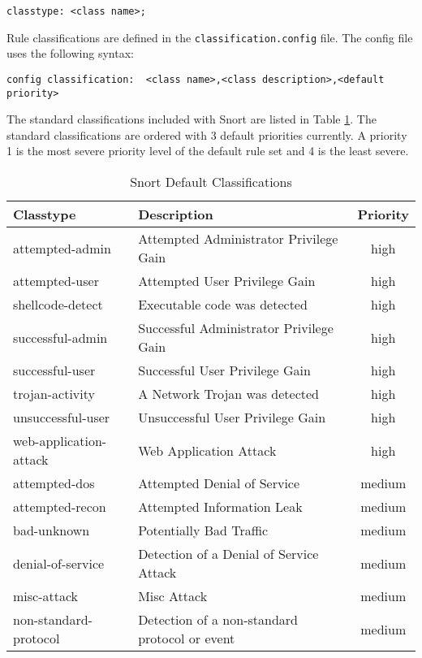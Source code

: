 \documentclass[english]{report}
\begin{document}
\begin{verbatim}
classtype: <class name>;
\end{verbatim}
Rule classifications are defined in the \texttt{classification.config}
file. The config file uses the following syntax:

\begin{verbatim}
config classification:  <class name>,<class description>,<default priority>
\end{verbatim}
The standard classifications included with Snort are listed in Table
\ref{Snort Default Classifications}. The standard classifications
are ordered with 3 default priorities currently. A priority 1 is the
most severe priority level of the default rule set and 4 is the least
severe.


\begin{center}
\begin{longtable}{|p{2in}|p{2.5in}|c|}
\caption{Snort Default Classifications \label{Snort Default Classifications}} \\
\hline 
Classtype & Description & Priority \\
\hline
\hline 
attempted-admin&
Attempted Administrator Privilege Gain & high \\
\hline 
attempted-user&
Attempted User Privilege Gain & high\\
\hline 
shellcode-detect&
Executable code was detected & high\\
\hline 
successful-admin&
Successful Administrator Privilege Gain & high\\
\hline 
successful-user&
Successful User Privilege Gain & high\\
\hline 
trojan-activity&
A Network Trojan was detected & high\\
\hline 
unsuccessful-user&
Unsuccessful User Privilege Gain & high\\
\hline 
web-application-attack&
Web Application Attack & high\\
\hline
attempted-dos&
Attempted Denial of Service & medium\\
\hline 
attempted-recon&
Attempted Information Leak & medium\\
\hline 
bad-unknown&
Potentially Bad Traffic & medium\\
\hline 
denial-of-service&
Detection of a Denial of Service Attack & medium\\
\hline 
misc-attack&
Misc Attack & medium\\
\hline 
non-standard-protocol&
Detection of a non-standard protocol or event & medium\\

\end{longtable}
\end{center}
\end{document}
